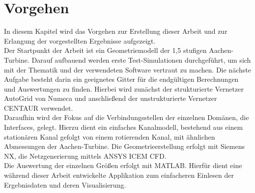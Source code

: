 \chapter{Vorgehen}
In diesem Kapitel wird das Vorgehen zur Erstellung dieser Arbeit und zur Erlangung der vorgestellten Ergebnisse aufgezeigt. \\
Der Startpunkt der Arbeit ist ein Geometriemodell der 1,5 stufigen Aachen-Turbine. Darauf aufbauend werden erste Test-Simulationen durchgeführt, um sich mit der Thematik und der verwendeten Software vertraut zu machen. Die nächste Aufgabe besteht darin ein geeignetes Gitter für die endgültigen Berechnungen und Auswertungen zu finden. Hierbei wird zunächst der strukturierte Vernetzer AutoGrid von Numeca und anschließend der unstrukturierte Vernetzer CENTAUR verwendet.\\
Daraufhin wird der Fokus auf die Verbindungsstellen der einzelnen Domänen, die Interfaces, gelegt. Hierzu dient ein einfaches Kanalmodell, bestehend aus einem stationären Kanal gefolgt von einem rotierenden Kanal, mit ähnlichen Abmessungen der Aachen-Turbine. Die Geometrieerstellung erfolgt mit Siemens NX, die Netzgenerierung mittels ANSYS ICEM CFD.\\ 
Die Auswertung der einzelnen Größen erfolgt mit MATLAB. Hierfür dient eine während dieser Arbeit entwickelte Applikation zum einfacheren Einlesen der Ergebnisdaten und deren Visualisierung.    

